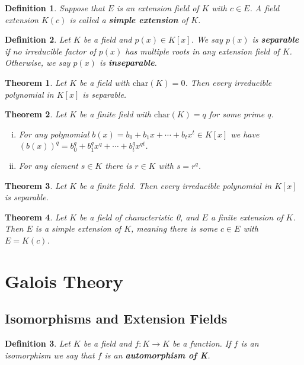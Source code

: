 \documentclass[letterpaper, 12pt]{article}
\renewcommand{\char}[1]{\text{char}(#1)}
\newtheorem{defn}{Definition}
\newtheorem{thm}{Theorem}
\begin{document}
			\setcounter{defn}{27}
			\begin{defn}
			Suppose that $E$ is an extension field of $K$ with $c \in E$.
			A field extension $K(c)$ is called a \textbf{simple extension} of $K$.
			\end{defn}

			\begin{defn}
			Let $K$ be a field and $p(x) \in K[x]$.
			We say $p(x)$ is \textbf{separable} if no irreducible factor of $p(x)$ has multiple roots in any extension field of $K$.
			Otherwise, we say $p(x)$ is \textbf{inseparable}.
			\end{defn}

			\setcounter{thm}{30}
			\begin{thm}
			Let $K$ be a field with $\char{K} = 0$.
			Then every irreducible polynomial in $K[x]$ is separable.
			\end{thm}

			\begin{thm}
			Let $K$ be a finite field with $\char{K} = q$ for some prime $q$.
				\begin{enumerate}[(i)]
				\item For any polynomial $b(x) = b_{0} + b_{1}x + \cdots + b_{t}x^{t} \in K[x]$ we have $(b(x))^{q} = b_{0}^{q} + b_{1}^{q}x^{q} + \cdots + b_{t}^{q}x^{qt}$.
				\item For any element $s \in K$ there is $r \in K$ with $s = r^{q}$.
				\end{enumerate}
			\end{thm}

			\begin{thm}
			Let $K$ be a finite field.
			Then every irreducible polynomial in $K[x]$ is separable.
			\end{thm}

			\begin{thm}
			Let $K$ be a field of characteristic 0, and $E$ a finite extension of $K$.
			Then $E$ is a simple extension of $K$, meaning there is some $c \in E$ with $E = K(c)$.
			\end{thm}

	\section{Galois Theory}
	\label{sec:galois_theory}
		\setcounter{defn}{0}
		\setcounter{thm}{0}

		\subsection{Isomorphisms and Extension Fields}
		\label{sec:isomorphisms_and_extension_fields}
			\setcounter{defn}{1}
			\begin{defn}
			Let $K$ be a field and $f : K \to K$ be a function.
			If $f$ is an isomorphism we say that $f$ is an \textbf{automorphism of K}.
			\end{defn}
\end{document}
